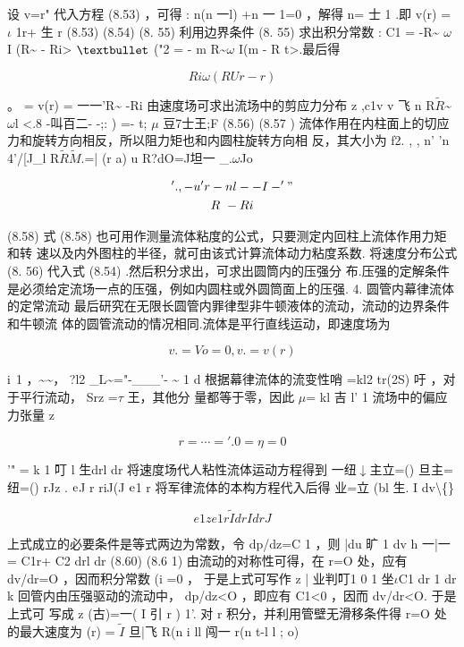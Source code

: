 设 v=r" 代入方程 (8.53) ，可得 : n(n 一l) +n 一 1=0 ，解得 n= 士 1 .即 v(r) = $\iota$ 1r+ 生 r (8.53) (8.54) (8. 55) 利用边界条件 (8. 55) 求出积分常数 : C1 = -R\textasciitilde{} $\omega$ I (R\textasciitilde{} - Ri> ${\rm •}$ ("2 = - m R\textasciitilde{}$\omega$ I(m - R t>.最后得

\[Ri\omega  (RUr- r)\]

。 = v(r) = 一一'R\textasciitilde{} -Ri 由速度场可求出流场中的剪应力分布 z ,c1v v 飞 n R$\tilde{R}$\textasciitilde{} $\omega$l <.8 -叫百二- -;: ) =- t; $\mu$ 豆7士王;F (8.56) (8.57 ) 流体作用在内柱面上的切应力和旋转方向相反，所以阻力矩也和内圆柱旋转方向相 反，其大小为 f2. , , n' 'n 4'/[J\_l R$\tilde{R}$$\tilde{M}$.=| (r a) u R?dO=J坦一 \_.$\omega$Jo

\begin{gather*}
'.,-u'r-nl--I-'"\\
R~-Ri
\end{gather*}

(8.58) 式 (8.58) 也可用作测量流体粘度的公式，只要测定内回柱上流体作用力矩和转 速以及内外图柱的半径，就可由该式计算流体动力粘度系数. 将速度分布公式 (8. 56) 代入式 (8.54) .然后积分求出，可求出圆筒内的压强分 布.压强的定解条件是必须给定流场一点的压强，例如内圆柱或外圆筒面上的压强. 4. 圆管内幕律流体的定常流动 最后研究在无限长圆管内罪律型非牛顿液体的流动，流动的边界条件和牛顿流 体的圆管流动的情况相同.流体是平行直线运动，即速度场为

\begin{equation*}v. = Vo = 0 , v. = v( r)\tag{8.59}\end{equation*}

${\rm i}$ 1 ，\textasciitilde{}\textasciitilde{}， ?l2 \_L\textasciitilde{}="-\_\_\_'- \textasciitilde{} 1 d 根据幕律流体的流变性哨 =kl2 tr(2S) 吁 ，对于平行流动， Srz =$\tau$ 王，其他分 量都等于零，因此 $\mu$= kl 吉 l' 1 流场中的偏应力张量 z

\[r= \cdots  = '.0 = \eta =0\]

'" = k 1 叮 l 生drl dr 将速度场代人粘性流体运动方程得到 一纽$\downarrow$主立=() 旦主=纽=() rJz . ${\rm e}$J r riJ(J ${\rm e}$1 r 将军律流体的本构方程代入后得 业=立 (bl 生. I dv\textbackslash\{\}

\[e1 z e1 r   \tilde{I} dr I dr J\]

上式成立的必要条件是等式两边为常数，令 dp/dz=C 1 ，则 |du 旷 1 dv h 一|一 = C1r+ C2 drl dr (8.60) (8.6 1) 由流动的对称性可得，在 r=O 处，应有 dv/dr=O ，因而积分常数 (i =0 ， 于是上式可写作 z | 业判叮1 0 1 坐$\iota$C1 dr 1 dr k 回管内由压强驱动的流动中， dp/dz<O ，即应有 C1<0 ，因而 dv/dr<O. 于是上式可 写成 z (古)=一( I 引 r ) 1'. 对 r 积分，并利用管壁无滑移条件得 r=O 处的最大速度为 (r) = $\tilde{I}$ 旦|飞 R(n i ll 闯一 r(n t-l l ; o)

